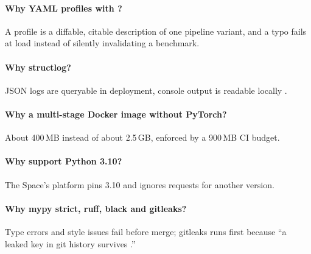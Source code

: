 \paragraph{Why YAML profiles with ?} A profile is a diffable, citable description of one pipeline variant, and a typo fails at load instead of silently invalidating a benchmark.

\paragraph{Why structlog?} JSON logs are queryable in deployment, console output is readable locally .

\paragraph{Why a multi-stage Docker image without PyTorch?} About 400\,MB instead of about 2.5\,GB, enforced by a 900\,MB CI budget.

\paragraph{Why support Python 3.10?} The Space's platform pins 3.10 and ignores requests for another version.

\paragraph{Why mypy strict, ruff, black and gitleaks?} Type errors and style issues fail before merge; gitleaks runs first because \enquote{a leaked key in git history survives .}
